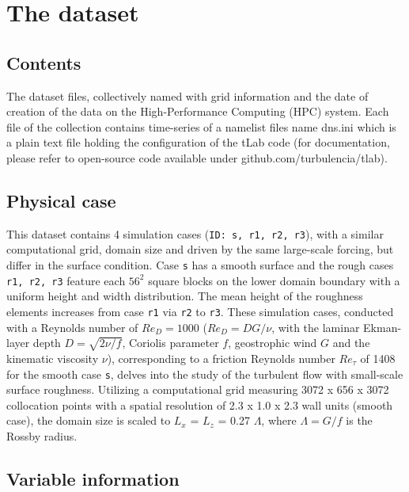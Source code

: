 \documentclass[11pt]{article}
\begin{document}
\section{The dataset}

\subsection{Contents}

The dataset files, collectively named with grid information and the date of creation of the data on the High-Performance Computing (HPC) system. Each file of the collection contains time-series of a namelist files name dns.ini which is a plain text file holding the configuration of the tLab code (for documentation, please refer to open-source code available under github.com/turbulencia/tlab). \\

\subsection{Physical case}

This dataset contains 4 simulation cases (\texttt{ID: s, r1, r2, r3}), with a similar computational grid, domain size and driven by the same large-scale forcing, but differ in the surface condition. Case \texttt{s} has a smooth surface and the rough cases \texttt{r1, r2, r3} feature each $56^2$ square blocks on the lower domain boundary with a uniform height and width distribution. The mean height of the roughness elements increases from case \texttt{r1} via \texttt{r2} to \texttt{r3}.
These simulation cases, conducted with a Reynolds number of $Re_D=1000$ ($Re_D=DG/\nu$, with the laminar Ekman-layer depth $D=\sqrt{2\nu/ f}$, Coriolis parameter $f$, geostrophic wind $G$ and the kinematic viscosity $\nu$), corresponding to a friction Reynolds number \(Re_{\tau}\) of 1408 for the smooth case \texttt{s}, delves into the study of the turbulent flow with small-scale surface roughness. Utilizing a computational grid measuring 3072 x 656 x 3072 collocation points with a spatial resolution of 2.3 x 1.0 x 2.3 wall units (smooth case), the domain size is scaled to \(L_x\) = \(L_z\) = 0.27 \(\Lambda\), where \(\Lambda=G/f\) is the Rossby radius.\\

\subsection{Variable information} 
\end{document}
